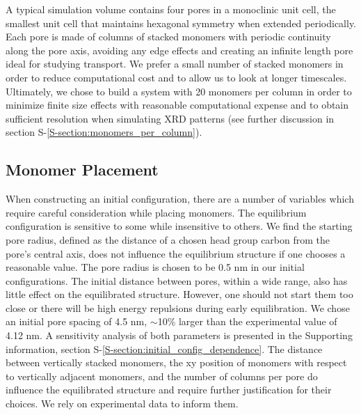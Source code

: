 \documentclass[journal=jpcbfk,manuscript=article]{achemso}
\begin{document}
  
  A typical simulation volume contains four pores in a monoclinic unit cell,
  the smallest unit cell that maintains hexagonal symmetry when extended
  periodically. Each pore is made of columns of stacked monomers with periodic
  continuity along the pore axis, avoiding any edge effects and creating an
  infinite length pore ideal for studying transport. We prefer a small number of stacked
  monomers in order to reduce computational cost and to allow us to look at
  longer timescales. Ultimately, we chose to build a system with 20 monomers
  per column in order to minimize finite size effects with reasonable computational expense 
  and to obtain sufficient resolution when simulating XRD patterns (see further discussion
  in section S-\ref{S-section:monomers_per_column}).
 
  \subsection{Monomer Placement} 

  When constructing an initial configuration, there are a number of variables
  which require careful consideration while placing monomers. The equilibrium
  configuration is sensitive to some while insensitive to others. We find the starting
  pore radius, defined as the distance of a chosen head group carbon from the
  pore's central axis, does not influence the equilibrium structure if one chooses
  a reasonable value. The pore radius is chosen to be 0.5 nm in our initial
  configurations. The initial distance between pores, within a wide range, also has 
  little effect on the equilibrated structure. However, one should not start them
  too close or there will be high energy repulsions during early equilibration. We 
  chose an initial pore spacing of 4.5 nm, $\sim$10\% larger than the experimental value
  of 4.12 nm. A sensitivity analysis of both parameters is presented in the 
  Supporting information, section S-\ref{S-section:initial_config_dependence}. The 
  distance between vertically stacked monomers, the xy position of monomers with respect 
  to vertically adjacent monomers, and the number of columns per pore do influence the 
  equilibrated structure and require further justification for their choices. We rely on 
  experimental data to inform them. 
\end{document}
